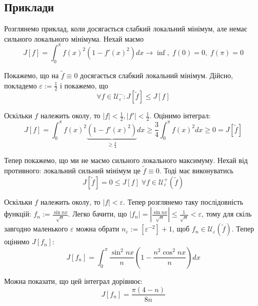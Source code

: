\documentclass[14pt]{extarticle}
\newcommand{\<}{\langle}
\renewcommand{\>}{\rangle}
\theoremstyle{mystyle}{\newtheorem{definition}{Definition}[section]}
\theoremstyle{mystyle}{\newtheorem{proposition}[definition]{Proposition}}
\theoremstyle{mystyle}{\newtheorem{theorem}[definition]{Theorem}}
\theoremstyle{mystyle}{\newtheorem{lemma}[definition]{Lemma}}
\theoremstyle{mystyle}{\newtheorem{corollary}[definition]{Corollary}}
\theoremstyle{mystyle}{\newtheorem*{remark}{Remark}}
\theoremstyle{mystyle}{\newtheorem*{remarks}{Remarks}}
\theoremstyle{mystyle}{\newtheorem*{example}{Example}}
\theoremstyle{mystyle}{\newtheorem*{examples}{Examples}}
\theoremstyle{definition}{\newtheorem*{exercise}{Exercise}}
\theoremstyle{cstyle}{\newtheorem*{cthm}{}}
\theoremstyle{warn}
\begin{document}
\subsection{Приклади}

Розглянемо приклад, коли досягається слабкий локальний мінімум, але немає сильного локального мінімума. Нехай маємо
\begin{equation}
    J[f] = \int_0^{\pi}f(x)^2(1-f'(x)^2)dx \to \inf, \; f(0)=0, \; f(\pi)=0
\end{equation}

Покажемо, що на $\widetilde{f}\equiv 0$ досягається слабкий локальний мінімум. Дійсно, покладемо $\varepsilon := \frac{1}{2}$ і покажемо, що 
\begin{equation}
    \forall f \in \mathcal{U}_{\varepsilon}^{-}: J[\widetilde{f}] \leq J[f]
\end{equation}

Оскільки $f$ належить околу, то $|f|<\frac{1}{2},|f'|<\frac{1}{2}$. Оцінимо інтеграл:
\begin{equation}
    J[f] = \int_0^{\pi}f(x)^2\underbrace{(1-f'(x)^2)}_{\geq \frac{3}{4}}dx \geq \frac{3}{4}\int_0^{\pi}f(x)^2dx \geq 0 = J[\widetilde{f}]
\end{equation}

Тепер покажемо, що ми не маємо сильного локального максимуму. Нехай від противного: локальний сильний мінімум це $\widetilde{f} \equiv 0$. Тоді має виконуватись
\begin{equation}
    J[\widetilde{f}] = 0 \leq J[f] \; \forall f \in \mathcal{U}_{\varepsilon}^{+}(\widetilde{f})
\end{equation}

Оскільки $f$ належить околу, то $|f|<\varepsilon$. Тепер розглянемо таку послідовність функцій: $f_n := \frac{\sin nx}{\sqrt{n}}$. 
Легко бачити, що $|f_n|=\left|\frac{\sin nx}{\sqrt{n}}\right| \leq \frac{1}{\sqrt{n}}<\varepsilon$, тому для скіль завгодно 
маленького $\varepsilon$ можна обрати $n_{\varepsilon} := [\varepsilon^{-2}]+1$, щоб $f_n \in \mathcal{U}_{\varepsilon}(\widetilde{f})$. Тепер оцінимо $J[f_n]$:
\begin{equation}
    J[f_n] = \int_0^{\pi}\frac{\sin^2 nx}{n}\left(1-\frac{n^2\cos^2nx}{n}\right)dx
\end{equation}

Можна показати, що цей інтеграл дорівнює:
\begin{equation}
    J[f_n] = \frac{\pi(4-n)}{8n}
\end{equation}
\end{document}
